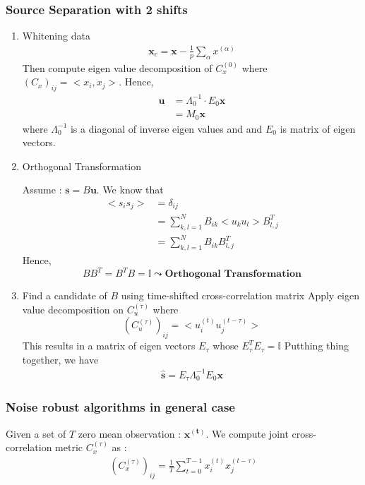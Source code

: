 \subsubsection{Source Separation with 2 shifts}
\begin{enumerate}
	\item  Whitening data 
	\begin{align*}
		\boldsymbol{x}_c = \boldsymbol{x} - \frac{1}{p} \sum_{\alpha} x^{(\alpha)}
	\end{align*}
	Then compute eigen value decomposition of $C_x^{(0)}$ where $(C_x)_{ij} = <x_i, x_j>$. Hence,
	\begin{align*}
		\boldsymbol{u} &= \Lambda_0^{-1}  \cdot E_0 \boldsymbol{x} \\
		&= M_0 \boldsymbol{x}
	\end{align*}
	where $\Lambda_0^{-1}$ is a diagonal of inverse eigen values and and $E_0$ is matrix of eigen vectors.
	\item Orthogonal Transformation

	Assume : $\boldsymbol{s} = B\boldsymbol{u}$. We know that 
	\begin{align*}
		<s_is_j> &= \delta_{ij} \\
		&= \sum_{k,l=1}^{N}B_{ik}<u_ku_l>B_{l,j}^{T} \\
		&= \sum_{k,l=1}^{N}B_{ik} B_{l,j}^{T} \tag*{($<u_ku_l> = 1 $ from Whitening)} 
	\end{align*} 
	Hence, $$BB^T  = B^TB = \mathbb{I} \leadsto \textbf{Orthogonal Transformation}$$
	
	\item Find a candidate of $B$ using time-shifted cross-correlation matrix
	Apply eigen value decomposition  on $C_u^{(\tau)}$ where 
	$$(C_u^{(\tau)})_{ij} = <u_i^{(t)} u_j^{(t-\tau)} >$$
	This results in a matrix of eigen vectors $E_{\tau}$ whose $E_{\tau}^TE_\tau = \mathbb{I}$ 
	Putthing thing together, we have 
	\begin{align*}
		\boldsymbol{\hat{s}} = E_\tau \Lambda_0^{-1}  E_0 \boldsymbol{x}
	\end{align*}
\end{enumerate}

\subsubsection{Noise robust algorithms in general case}
Given a set of $T$ zero mean observation : $\boldsymbol{x^{(t)}}$. We compute joint cross-correlation metric $C_x^{(\tau)}$ as :
\begin{align*}
(C_x^{(\tau)})_{ij} = \frac{1}{T}	\sum_{t=0}^{T-1}  x_i^{(t)} x_j^{(t-\tau)}
\end{align*}

